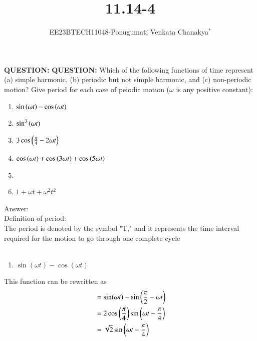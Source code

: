 \documentclass[journal,12pt,twocolumn]{IEEEtran}
\theoremstyle{remark}
\begin{document}
 
 \vspace{3cm}
 \title{\textbf{11.14-4}}
 \author{EE23BTECH11048-Ponugumati Venkata Chanakya$^{*}$%
 }
 \maketitle
 \newpage
 \bigskip
 \renewcommand{\thefigure}{\theenumi}
 \renewcommand{\thetable}{\theenumi}
 \textbf{QUESTION:}
 \textbf{QUESTION:}
 Which of the following functions of time represent (a) simple harmonic, (b) periodic
 but not simple harmonic, and (c) non-periodic motion? Give period for each case of
 peiodic motion ($\omega$ is any positive constant):\\
 \begin{enumerate}
 \item $\sin\left(\omega t\right)-\cos\left(\omega t\right)$\\
 \item $\sin^3\left(\omega t\right)$\\
 \item $3\cos\left(\frac{\pi}{4}- 2\omega t\right)$\\
 \item $\cos\left(\omega t\right)+\cos\left(3\omega t\right)+\cos\left(5\omega t\right)$\\
 \item {}\\
 \item $1+\omega t+\omega^2 t^2$\\
  \end{enumerate}
 Answer:\\
   Definition of period:\\The period is denoted by the symbol "T," and it represents the time interval required for the motion to go through one complete cycle\\
   \\
   \begin{enumerate}
 \item $\sin(\omega t)- \cos(\omega t)$\\
  \end{enumerate}
  This function can be rewritten as\\ 
 \begin{align}
  &= \sin(\omega t) - \sin\left(\frac{\pi}{2} - \omega t\right)\\
  &=2 \cos\left(\frac{\pi}{4}\right) \sin\left(\omega t - \frac{\pi}{4}\right)\\
  &=\sqrt{2}\sin\left(\omega t - \frac{\pi}{4}\right)
 \end{align}
\end{document}
